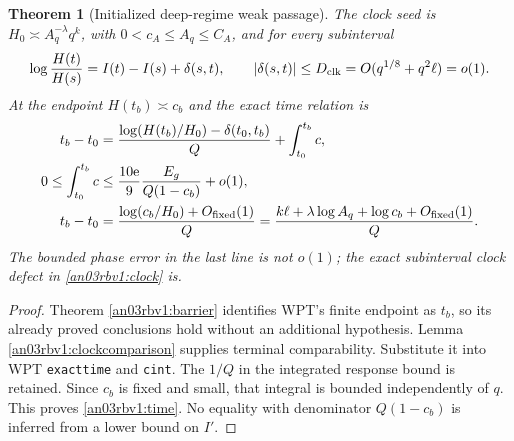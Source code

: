\documentclass[11pt]{article}
\numberwithin{equation}{section}
\newtheorem{theorem}{Theorem}[section]
\theoremstyle{remark}\newtheorem{remark}[theorem]{Remark}
\begin{document}
\begin{theorem}[Initialized deep-regime weak passage]
The clock seed is $H_0\asymp A_q^{-\lambda}q^k$, with
$0<c_A\le A_q\le C_A$, and for every subinterval
\begin{equation}
 \log\frac{H(t)}{H(s)}=I(t)-I(s)+\delta(s,t),\qquad
 |\delta(s,t)|\le D_{\rm clk}=O(q^{1/8}+q^2\ell)=o(1).
 \label{an03rbv1:clock}
\end{equation}
At the endpoint $H(t_b)\asymp c_b$ and the exact time relation is
\begin{align}
 t_b-t_0
 &=\frac{\log(H(t_b)/H_0)-\delta(t_0,t_b)}{Q}
                                  +\int_{t_0}^{t_b}c,\notag\\
 0\le\int_{t_0}^{t_b}c
 &\le\frac{10\mathrm e}{9}\frac{E_g}{Q(1-c_b)}+o(1),\notag\\
 t_b-t_0
 &=\frac{\log(c_b/H_0)+O_{\rm fixed}(1)}Q
  =\frac{k\ell+\lambda\log A_q+\log c_b+O_{\rm fixed}(1)}Q.
 \label{an03rbv1:time}
\end{align}
The bounded phase error in the last line is not $o(1)$;
the exact subinterval clock defect in \eqref{an03rbv1:clock} is.
\end{theorem}
\begin{proof}
Theorem \ref{an03rbv1:barrier} identifies WPT's finite endpoint
as $t_b$, so its already proved conclusions hold without an
additional hypothesis. Lemma \ref{an03rbv1:clockcomparison}
supplies terminal comparability. Substitute it into WPT
\texttt{exacttime} and \texttt{cint}. The $1/Q$ in the integrated
response bound is retained. Since $c_b$ is fixed and small, that
integral is bounded independently of $q$. This proves
\eqref{an03rbv1:time}. No equality with denominator $Q(1-c_b)$
is inferred from a lower bound on $I'$.
\end{proof}
\end{document}
